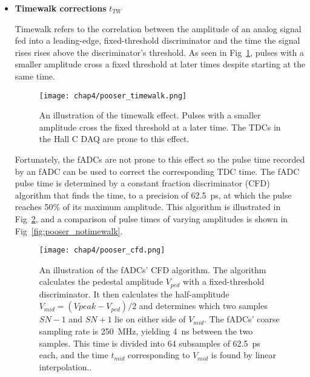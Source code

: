 \begin{itemize}
    \item \textbf{Timewalk corrections} $t_{TW}$

Timewalk refers to the correlation between
the amplitude of an analog signal fed into a leading-edge, fixed-threshold discriminator
and the time the signal rises rises above the discriminator's threshold.
As seen in Fig~\ref{fig:pooser_timewalk}, pulses with a smaller amplitude cross
a fixed threshold at later times despite starting at the same time.

\begin{figure}[!h]
    \centering
    \texttt{[image: chap4/pooser\_timewalk.png]}
    \caption[An illustration of the timewalk effect.]{
            An illustration of the timewalk effect.
            Pulses with a smaller amplitude cross the fixed threshold at a
            later time.
            The TDCs in the Hall C DAQ are prone to this effect.
            }
    \label{fig:pooser_timewalk}
\end{figure}

Fortunately, the fADCs are not prone to this effect so the pulse time recorded
by an fADC can be used to correct the corresponding TDC time.
The fADC pulse time is determined by a constant fraction discriminator (CFD)
algorithm that finds the time,
to a precision of \SI{62.5}{\pico\second},
at which the pulse reaches 50\% of its maximum amplitude.
This algorithm is illustrated in Fig~\ref{fig:pooser_cfd}, and a comparison of
pulse times of varying amplitudes is shown in Fig~\ref{fig:pooser_notimewalk}.

\begin{figure}[!h]
    \centering
    \texttt{[image: chap4/pooser\_cfd.png]}
    \caption[An illustration of the fADCs' CFD algorithm.]{
            An illustration of the fADCs' CFD algorithm.
            The algorithm calculates the pedestal amplitude $V_{ped}$ with a
            fixed-threshold discriminator.
            It then calculates the half-amplitude $V_{mid}=(V{peak}-V_{ped})/2$
            and determines which two samples $SN-1$ and $SN+1$ lie on either
            side of $V_{mid}$.
            The fADCs' coarse sampling rate is \SI{250}{\mega\hertz}, yielding
            \SI{4}{\nano\second} between the two samples.
            This time is divided into 64 subsamples of \SI{62.5}{\pico\second}
            each, and the time $t_{mid}$ corresponding to $V_{mid}$ is found by
            linear interpolation..
            }
    \label{fig:pooser_cfd}
\end{figure}


\end{itemize}

